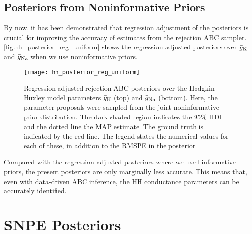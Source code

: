 \subsection{Posteriors from Noninformative Priors}

By now, it has been demonstrated that regression adjustment of the posteriors is crucial for improving the accuracy of estimates from the rejection ABC sampler. \autoref{fig:hh_posterior_reg_uniform} shows the regression adjusted posteriors over $\bar{g}_{\mathrm{K}}$ and $\bar{g}_{\mathrm{Na}}$ when we use noninformative priors.
\begin{figure}[!htb]
    \centering
    \texttt{[image: hh\_posterior\_reg\_uniform]}
    \caption{Regression adjusted rejection ABC posteriors over the Hodgkin-Huxley model parameters $\bar{g}_{\mathrm{K}}$ (top) and $\bar{g}_{\mathrm{Na}}$ (bottom). Here, the parameter proposals were sampled from the joint noninformative prior distribution. The dark shaded region indicates the 95\% HDI and the dotted line the MAP estimate. The ground truth is indicated by the red line. The legend states the numerical values for each of these, in addition to the RMSPE in the posterior.}
    \label{fig:hh_posterior_reg_uniform}
\end{figure} 
Compared with the regression adjusted posteriors where we used informative priors, the present posteriors are only marginally less accurate. This means that, even with data-driven ABC inference, the HH conductance parameters can be accurately identified.


\section{SNPE Posteriors}

